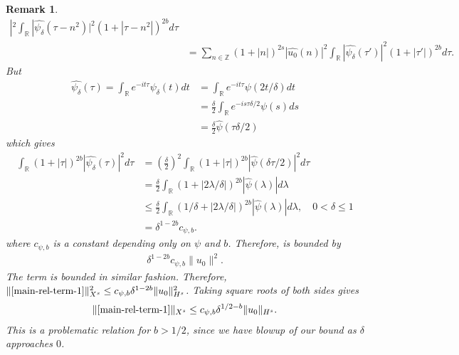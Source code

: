 \documentclass[12pt,reqno]{amsart}
\numberwithin{equation}{section}  %
\renewcommand{\cref}{\Cref}
\newcommand{\rr}{\mathbb{R}}
\newcommand{\zz}{\mathbb{Z}}
\newcommand{\wh}{\widehat}
\newtheorem{remark}[theorem]{Remark}
\begin{document}
\begin{framed}
\begin{remark}
\begin{equation}
\begin{split}
    |^{2} \int_{\rr} | \wh{\psi_{\delta}}(\tau - n^{2}) |^{2}\left( 1 +  | \tau  -
    n^{2} | \right)^{2b} d \tau
    \\
    & = \sum_{n \in \zz} \left( 1 + |n| \right)^{2s} | \wh{u_{0}}(n)
    |^{2} \int_{\rr} | \wh{\psi_{\delta}}(\tau') |^{2}\left( 1 +  | \tau'|
    \right)^{2b} d \tau.
  \end{split}
\end{equation}
%
But 
%
%
\begin{equation}
  \label{cutoff-scaling}
\begin{split}
  \wh{\psi_{\delta}}(\tau)
  = \int_{\rr} e^{-it \tau} \psi_{\delta}(t) dt
  & = \int_{\rr} e^{-it \tau} \psi(2t/\delta) dt
  \\
  & = \frac{\delta}{2} \int_{\rr} e^{-is \tau \delta/2} \psi(s) ds
  \\
  & = \frac{\delta}{2} \wh{\psi}(\tau \delta/2)
\end{split}
\end{equation}
%
%
which gives
%
%
\begin{equation}
  \label{cutoff-scaling-p}
\begin{split}
  \int_{\rr} (1 + | \tau |)^{2b} | \wh{\psi_{\delta}}(\tau) |^{2} d
  \tau
  & = \left (\frac{\delta}{2} \right )^{2} \int_{\rr} (1 + | \tau |)^{2b} | \wh{\psi}(\delta \tau
  /2) |^{2} d
  \tau
  \\
  & =  \frac{\delta}{2}  \int_{\rr} (1 + | 2 \lambda /\delta |)^{2b} | \wh{\psi}(\lambda) | d \lambda
  \\
  & \le \frac{\delta}{2} \int_{\rr} (1/\delta + | 2 \lambda / \delta |)^{2b} | \wh{\psi}(\lambda) | d
  \lambda, \quad 0 < \delta \le 1
  \\
  & = \delta^{1-2b} c_{\psi,b}.
\end{split}
\end{equation}
where $c_{\psi, b}$ is a constant depending only on $\psi$ and $b$.
Therefore, \cref{1uuy} is bounded by 
\begin{equation*}
\begin{split}
  \delta^{1-2b} c_{\psi,b} \| u_{0} \|^{2}.
\end{split}
\end{equation*}
%
%
%
The
term \cref{1u-0-norm-comp-3} is bounded in similar fashion. Therefore, 
$\|\cref{main-rel-term-1}\|_{X^{s}}^{2} \le c_{\psi,b} \delta^{1-2b}
\|u_{0}\|_{H^s}^2$. Taking square roots of both sides gives
%
%
\begin{equation}
  \begin{split}
    \|\cref{main-rel-term-1}\|_{X^{s}} \le c_{\psi,b} \delta^{1/2-b}
    \|u_{0}\|_{H^s}.
  \end{split}
  \label{1eqn:u-0-fin-est}
\end{equation}
This is a problematic relation for $b > 1/2$, since we have blowup of our bound
as $\delta$ approaches $0$.
\end{remark}
\end{framed}
%
\end{document}
